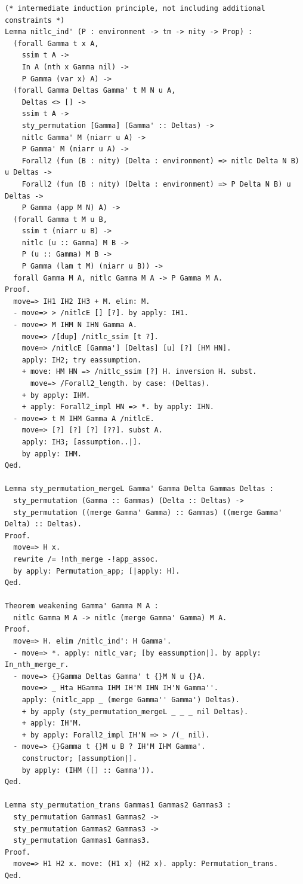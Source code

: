 \begin{lstlisting}[style=authorcoq]
(* intermediate induction principle, not including additional constraints *)
Lemma nitlc_ind' (P : environment -> tm -> nity -> Prop) :
  (forall Gamma t x A,
    ssim t A ->
    In A (nth x Gamma nil) -> 
    P Gamma (var x) A) ->
  (forall Gamma Deltas Gamma' t M N u A,
    Deltas <> [] ->
    ssim t A ->
    sty_permutation [Gamma] (Gamma' :: Deltas) ->
    nitlc Gamma' M (niarr u A) ->
    P Gamma' M (niarr u A) ->
    Forall2 (fun (B : nity) (Delta : environment) => nitlc Delta N B) u Deltas ->
    Forall2 (fun (B : nity) (Delta : environment) => P Delta N B) u Deltas ->
    P Gamma (app M N) A) ->
  (forall Gamma t M u B,
    ssim t (niarr u B) ->
    nitlc (u :: Gamma) M B ->
    P (u :: Gamma) M B ->
    P Gamma (lam t M) (niarr u B)) ->
  forall Gamma M A, nitlc Gamma M A -> P Gamma M A.
Proof.
  move=> IH1 IH2 IH3 + M. elim: M.
  - move=> > /nitlcE [] [?]. by apply: IH1.
  - move=> M IHM N IHN Gamma A.
    move=> /[dup] /nitlc_ssim [t ?].
    move=> /nitlcE [Gamma'] [Deltas] [u] [?] [HM HN].
    apply: IH2; try eassumption.
    + move: HM HN => /nitlc_ssim [?] H. inversion H. subst.
      move=> /Forall2_length. by case: (Deltas).
    + by apply: IHM.
    + apply: Forall2_impl HN => *. by apply: IHN.
  - move=> t M IHM Gamma A /nitlcE.
    move=> [?] [?] [?] [??]. subst A.
    apply: IH3; [assumption..|].
    by apply: IHM.
Qed.

Lemma sty_permutation_mergeL Gamma' Gamma Delta Gammas Deltas :
  sty_permutation (Gamma :: Gammas) (Delta :: Deltas) ->
  sty_permutation ((merge Gamma' Gamma) :: Gammas) ((merge Gamma' Delta) :: Deltas).
Proof.
  move=> H x.
  rewrite /= !nth_merge -!app_assoc.
  by apply: Permutation_app; [|apply: H].
Qed.

Theorem weakening Gamma' Gamma M A :
  nitlc Gamma M A -> nitlc (merge Gamma' Gamma) M A.
Proof.
  move=> H. elim /nitlc_ind': H Gamma'.
  - move=> *. apply: nitlc_var; [by eassumption|]. by apply: In_nth_merge_r.
  - move=> {}Gamma Deltas Gamma' t {}M N u {}A.
    move=> _ Hta HGamma IHM IH'M IHN IH'N Gamma''.
    apply: (nitlc_app _ (merge Gamma'' Gamma') Deltas).
    + by apply (sty_permutation_mergeL _ _ _ nil Deltas).
    + apply: IH'M.
    + by apply: Forall2_impl IH'N => > /(_ nil).
  - move=> {}Gamma t {}M u B ? IH'M IHM Gamma'.
    constructor; [assumption|].
    by apply: (IHM ([] :: Gamma')).
Qed.

Lemma sty_permutation_trans Gammas1 Gammas2 Gammas3 :
  sty_permutation Gammas1 Gammas2 ->
  sty_permutation Gammas2 Gammas3 ->
  sty_permutation Gammas1 Gammas3.
Proof.
  move=> H1 H2 x. move: (H1 x) (H2 x). apply: Permutation_trans.
Qed.


\end{lstlisting}

